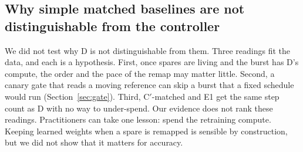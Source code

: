 \documentclass[journal]{IEEEtran}
\begin{document}
\subsection{Why simple matched baselines are not distinguishable from the controller}
We did not test why D is not distinguishable from them.
Three readings fit the data, and each is a hypothesis.
First, once spares are living and the burst has D's compute, the order and the pace of the remap may matter little.
Second, a canary gate that reads a moving reference can skip a burst that a fixed schedule would run (Section~\ref{sec:gate}).
Third, C$'$-matched and E1 get the same step count as D with no way to under-spend.
Our evidence does not rank these readings.
Practitioners can take one lesson: spend the retraining compute. Keeping learned weights when a spare is remapped is sensible by construction, but we did not show that it matters for accuracy.
\end{document}

